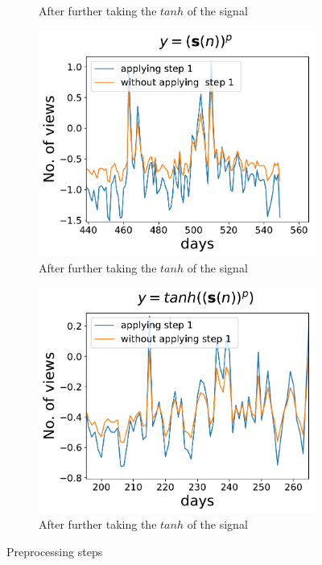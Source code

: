 \begin{figure}[h]
\begin{subfigure}[h]{0.5\textwidth}
          \caption{After further taking the $tanh$ of the signal}
          \label{fig:compare_tanh}
      \end{subfigure} 
     \begin{subfigure}[h]{0.5\textwidth}
         \includegraphics[width=\textwidth]{./description/images/compare_zoom_squeezed}
         \caption{After further taking the $tanh$ of the signal}
         \label{fig:compare_zoom_squeezed}
     \end{subfigure}
     \begin{subfigure}[h]{0.5\textwidth}
         \includegraphics[width=\textwidth]{./description/images/compare_zoom_tanh}
         \caption{After further taking the $tanh$ of the signal}
         \label{fig:compare_zoom_tanh}
     \end{subfigure}
      \caption{Preprocessing steps}\label{fig:preprocessing}
  \end{figure}
  
